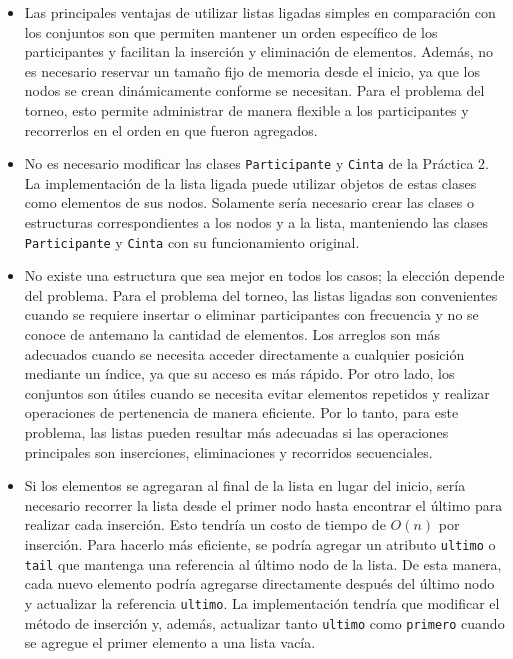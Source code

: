 \documentclass[12pt, letterpaper]{article}
\begin{document}
\begin{itemize}
    \item[a)] Las principales ventajas de utilizar listas ligadas simples en comparación con los conjuntos son que permiten mantener un orden específico de los participantes y facilitan la inserción y eliminación de elementos. Además, no es necesario reservar un tamaño fijo de memoria desde el inicio, ya que los nodos se crean dinámicamente conforme se necesitan. Para el problema del torneo, esto permite administrar de manera flexible a los participantes y recorrerlos en el orden en que fueron agregados.

    \item[b)] No es necesario modificar las clases \texttt{Participante} y \texttt{Cinta} de la Práctica 2. La implementación de la lista ligada puede utilizar objetos de estas clases como elementos de sus nodos. Solamente sería necesario crear las clases o estructuras correspondientes a los nodos y a la lista, manteniendo las clases \texttt{Participante} y \texttt{Cinta} con su funcionamiento original.

    \item[c)] No existe una estructura que sea mejor en todos los casos; la elección depende del problema. Para el problema del torneo, las listas ligadas son convenientes cuando se requiere insertar o eliminar participantes con frecuencia y no se conoce de antemano la cantidad de elementos. Los arreglos son más adecuados cuando se necesita acceder directamente a cualquier posición mediante un índice, ya que su acceso es más rápido. Por otro lado, los conjuntos son útiles cuando se necesita evitar elementos repetidos y realizar operaciones de pertenencia de manera eficiente. Por lo tanto, para este problema, las listas pueden resultar más adecuadas si las operaciones principales son inserciones, eliminaciones y recorridos secuenciales.

    \item[d)] Si los elementos se agregaran al final de la lista en lugar del inicio, sería necesario recorrer la lista desde el primer nodo hasta encontrar el último para realizar cada inserción. Esto tendría un costo de tiempo de $O(n)$ por inserción. Para hacerlo más eficiente, se podría agregar un atributo \texttt{ultimo} o \texttt{tail} que mantenga una referencia al último nodo de la lista. De esta manera, cada nuevo elemento podría agregarse directamente después del último nodo y actualizar la referencia \texttt{ultimo}. La implementación tendría que modificar el método de inserción y, además, actualizar tanto \texttt{ultimo} como \texttt{primero} cuando se agregue el primer elemento a una lista vacía.
\end{itemize}
\end{document}
